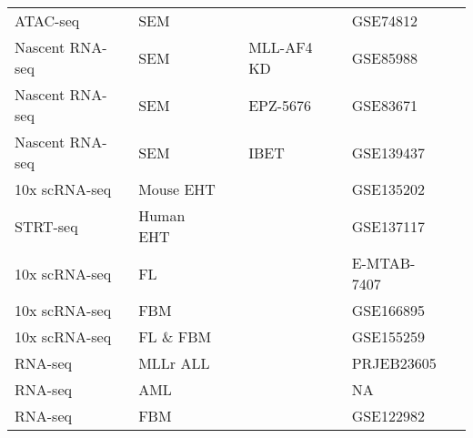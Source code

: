 \begin{table}[ht]
{\begin{tabular}{@{}llllll@{}}
    ATAC-seq & SEM &  &  & GSE74812 & \citep{kerry_mll-af4_2017} \\
    Nascent   RNA-seq & SEM &  & MLL-AF4 KD & GSE85988 & \citep{godfrey_mll-af4_2017} \\
    Nascent   RNA-seq & SEM &  & EPZ-5676 & GSE83671 & \citep{kerry_mll-af4_2017} \\
    Nascent   RNA-seq & SEM &  & IBET & GSE139437 & \citep{crump_bet_2021} \\
    10x scRNA-seq & Mouse EHT &  &  & GSE135202 & \citep{zhu_developmental_2020} \\
    STRT-seq & Human EHT &  &  & GSE137117 & \citep{zeng_tracing_2019} \\ 
    10x scRNA-seq & FL &  &  & E-MTAB-7407 & \citep{popescu_decoding_2019} \\
    10x scRNA-seq & FBM &  &  & GSE166895 & \citep{jardine_blood_2021} \\
    10x scRNA-seq & FL \& FBM &  &  & GSE155259 & \citep{roy_transitions_2021} \\
    RNA-seq & MLLr ALL &  &  & PRJEB23605 & \citep{agraz-doblas_unraveling_2019} \\
    RNA-seq & AML &  &  & NA & \citep{the_cancer_genome_atlas_research_network_genomic_2013} \\
    RNA-seq & FBM &  &  & GSE122982 & \citep{obyrne_discovery_2019} \\ \bottomrule
    \end{tabular}
    }
    \label{tbl:ch2_public}
    \end{table}
    






